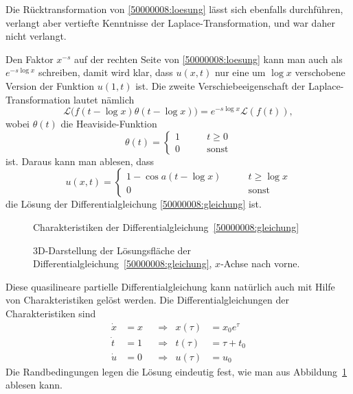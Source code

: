 \begin{diskussion}
Die Rücktransformation von \eqref{50000008:loesung} lässt sich
ebenfalls durchführen, verlangt aber vertiefte Kenntnisse der
Laplace-Transformation, und war daher nicht verlangt.

Den Faktor $x^{-s}$ auf der rechten Seite von \eqref{50000008:loesung}
kann man auch als $e^{-s\log x}$
schreiben, damit wird klar, dass $u(x,t)$ nur eine um $\log x$ verschobene
Version der Funktion $u(1,t)$ ist. 
Die zweite Verschiebeeigenschaft der Laplace-Transformation lautet nämlich
\[
\mathscr{L}\bigl(f(t-\log x)\theta(t-\log x)\bigr)
=
e^{-s\log x}\mathscr{L}(f(t)),
\]
wobei $\theta(t)$ die Heaviside-Funktion
\[
\theta(t)=\begin{cases}1\qquad&t \ge 0\\ 0&\text{sonst}\end{cases}
\]
ist. Daraus kann man ablesen, dass
\begin{equation}
u(x,t)=\begin{cases}
1-\cos a(t-\log x)\qquad
&t \ge \log x\\
0
&\text{sonst}
\end{cases}
\label{50000008:ruecktransformiert}
\end{equation}
die Lösung der Differentialgleichung \eqref{50000008:gleichung} ist.
\begin{figure}
\centering
{}
\caption{Charakteristiken der Differentialgleichung~\eqref{50000008:gleichung}
\label{50000008:charakteristiken}}
\end{figure}
\begin{figure}
\centering
{}
\caption{3D-Darstellung der Lösungsfläche der
Differentialgleichung~\eqref{50000008:gleichung}, $x$-Achse nach vorne.
\label{50000008:loesung}}
\end{figure}


Diese quasilineare partielle Differentialgleichung kann natürlich auch
mit Hilfe von Charakteristiken gelöst werden.
Die Differentialgleichungen der Charakteristiken sind
\begin{equation}
\begin{aligned}
\dot x&=x&
&\Rightarrow&
x(\tau)&=x_0e^\tau
\\
\dot t&=1&
&\Rightarrow&
t(\tau)&=\tau + t_0
\\
\dot u&=0&
&\Rightarrow&
u(\tau)&=u_0
\end{aligned}
\label{50000008:chardgl}
\end{equation}
Die Randbedingungen legen die Lösung eindeutig fest, wie man aus
Abbildung~\ref{50000008:charakteristiken} ablesen kann.


\end{diskussion}

